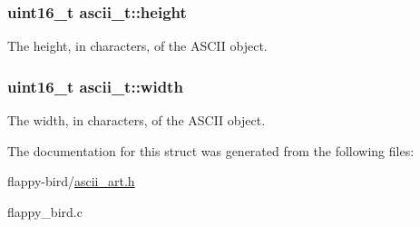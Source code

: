 \subsubsection[{\texorpdfstring{height}{height}}]{\setlength{\rightskip}{0pt plus 5cm}uint16\+\_\+t ascii\+\_\+t\+::height}\hypertarget{structascii__t_ab60ac2dac5effbff37ae096f0898ac54}{}\label{structascii__t_ab60ac2dac5effbff37ae096f0898ac54}
The height, in characters, of the A\+S\+C\+II object. 
\subsubsection[{\texorpdfstring{width}{width}}]{\setlength{\rightskip}{0pt plus 5cm}uint16\+\_\+t ascii\+\_\+t\+::width}\hypertarget{structascii__t_af246687087b404068b50c0fad93b2320}{}\label{structascii__t_af246687087b404068b50c0fad93b2320}
The width, in characters, of the A\+S\+C\+II object. 

The documentation for this struct was generated from the following files\+:\begin{DoxyCompactItemize}
\item 
flappy-\/bird/\hyperlink{ascii__art_8h}{ascii\+\_\+art.\+h}\item 
flappy\+\_\+bird.\+c\end{DoxyCompactItemize}
